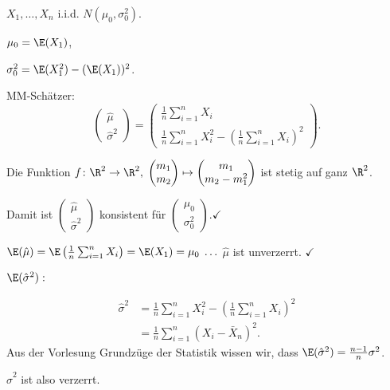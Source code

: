 \documentclass{tstextbook}
\begin{document}
\begin{example}[Normalverteilung]
	
	$ X_1, \ldots, X_n $ i.i.d. $ N\left(\mu_0, \sigma_0^2\right) $.
	
	$ \mu_0 = \E(X_1) $, 
	
	$ \sigma_0^2 = \E(X_1^2) - (\E(X_1))^2 $.
	
	MM-Schätzer: 
	\[
	\begin{pmatrix}
		\hat{\mu} \\ \hat{\sigma}^2 
	\end{pmatrix} 
	= \begin{pmatrix}
		\frac{1}{n} \sum_{i=1}^{n} X_i \\
		\frac{1}{n} \sum_{i=1}^{n} X_i^2 - \left(\frac{1}{n} \sum_{i=1}^{n} X_i\right)^2
	\end{pmatrix}.
	\]
	
	Die Funktion $ f \colon \R^2 \rightarrow \R^2, \; \begin{pmatrix} m_1 \\ m_2 \end{pmatrix} \mapsto \begin{pmatrix} m_1 \\ m_2-m_1^2 \end{pmatrix} $ ist stetig auf ganz $ \R^2 $. 
	
	Damit ist $ \begin{pmatrix} \hat{\mu} \\ \hat{\sigma}^2 \end{pmatrix} $ konsistent für $ \begin{pmatrix} \mu_0 \\ \sigma_0^2 \end{pmatrix} . \checkmark $
	
	$ \E(\hat{\mu}) = \E\left(\frac{1}{n} \sum_{i=1}^{n} X_i \right) = \E(X_1) = \mu_0 \; \ldots $ $ \hat{\mu} $ ist unverzerrt. $ \checkmark $
	
	$ \E(\hat{\sigma}^2): $ 
	
	\[
	\begin{aligned}
		\hat{\sigma}^2 & = \frac{1}{n} \sum_{i=1}^{n} X_i^2 - \left(\frac{1}{n} \sum_{i=1}^{n} X_i\right)^2 \\
		& = \frac{1}{n} \sum_{i=1}^{n} \left(X_i- \bar{X}_n \right)^2.
	\end{aligned}                      
	\]
	Aus der Vorlesung Grundzüge der Statistik wissen wir, dass 
	$ \E(\hat{\sigma}^2) = \frac{n-1}{n} \sigma^2 $. 
	
	$ \hat{\sigma}^2 $ ist also verzerrt. 
\end{example}
\end{document}
